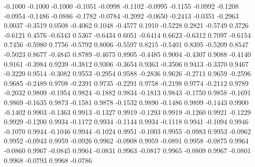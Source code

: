    -0.1000   -0.1000
   -0.1000   -0.1051
   -0.0998   -0.1102
   -0.0995   -0.1155
   -0.0992   -0.1208
   -0.0954   -0.1486
   -0.0886   -0.1782
   -0.0784   -0.2092
   -0.0650   -0.2413
   -0.0351   -0.2963
    0.0037   -0.3519
    0.0508   -0.4062
    0.1048   -0.4577
    0.1910   -0.5228
    0.2821   -0.5749
    0.3726   -0.6121
    0.4576   -0.6343
    0.5367   -0.6434
    0.6051   -0.6414
    0.6623   -0.6312
    0.7097   -0.6154
    0.7456   -0.5980
    0.7756   -0.5792
    0.8006   -0.5597
    0.8215   -0.5401
    0.8395   -0.5209
    0.8547   -0.5023
    0.8677   -0.4845
    0.8789   -0.4675
    0.8905   -0.4485
    0.9004   -0.4307
    0.9088   -0.4140
    0.9161   -0.3984
    0.9239   -0.3812
    0.9306   -0.3654
    0.9363   -0.3506
    0.9413   -0.3370
    0.9467   -0.3220
    0.9514   -0.3082
    0.9553   -0.2954
    0.9588   -0.2836
    0.9626   -0.2711
    0.9659   -0.2596
    0.9685   -0.2489
    0.9708   -0.2391
    0.9735   -0.2291
    0.9758   -0.2198
    0.9774   -0.2112
    0.9789   -0.2032
    0.9809   -0.1954
    0.9824   -0.1882
    0.9834   -0.1813
    0.9843   -0.1750
    0.9858   -0.1691
    0.9869   -0.1635
    0.9873   -0.1581
    0.9878   -0.1532
    0.9890   -0.1486
    0.9899   -0.1443
    0.9900   -0.1402
    0.9903   -0.1363
    0.9913   -0.1327
    0.9919   -0.1293
    0.9919   -0.1260
    0.9921   -0.1229
    0.9929   -0.1200
    0.9934   -0.1172
    0.9934   -0.1144
    0.9934   -0.1118
    0.9941   -0.1094
    0.9946   -0.1070
    0.9944   -0.1046
    0.9944   -0.1024
    0.9951   -0.1003
    0.9955   -0.0983
    0.9953   -0.0962
    0.9952   -0.0943
    0.9959   -0.0926
    0.9962   -0.0908
    0.9959   -0.0891
    0.9958   -0.0875
    0.9964   -0.0860
    0.9967   -0.0845
    0.9964   -0.0831
    0.9963   -0.0817
    0.9965   -0.0809
    0.9967   -0.0801
    0.9968   -0.0793
    0.9968   -0.0786
